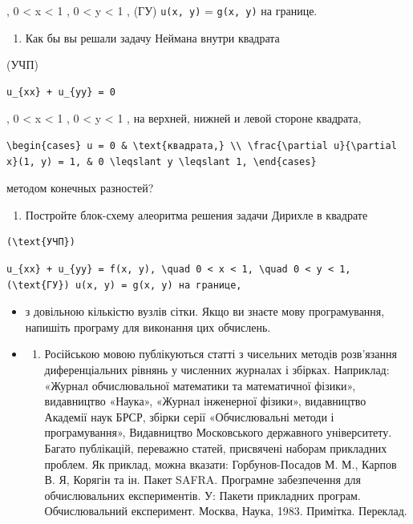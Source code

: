 \documentclass[
  ukrainian,
]{article}
\providecommand{\tightlist}{%
  \setlength{\itemsep}{0pt}\setlength{\parskip}{0pt}}
\begin{document}
, 0 \textless{} x \textless{} 1 , 0 \textless{} y \textless{} 1 , (ГУ)
\texttt{u(x,\ y)} = \texttt{g(x,\ y)} на границе.

\begin{enumerate}
\def\labelenumi{\arabic{enumi}.}
\setcounter{enumi}{4}
\tightlist
\item
  Как бы вы решали задачу Неймана внутри квадрата
\end{enumerate}

(УЧП)

\begin{verbatim}
u_{xx} + u_{yy} = 0
\end{verbatim}

, 0 \textless{} x \textless{} 1 , 0 \textless{} y \textless{} 1 , на
верхней, нижней и левой стороне квадрата,

\begin{verbatim}
\begin{cases} u = 0 & \text{квадрата,} \\ \frac{\partial u}{\partial x}(1, y) = 1, & 0 \leqslant y \leqslant 1, \end{cases}
\end{verbatim}

методом конечных разностей?

\begin{enumerate}
\def\labelenumi{\arabic{enumi}.}
\setcounter{enumi}{5}
\tightlist
\item
  Постройте блок-схему алеоритма решения задачи Дирихле в квадрате
\end{enumerate}

\begin{verbatim}
(\text{УЧП})
\end{verbatim}

\begin{verbatim}
u_{xx} + u_{yy} = f(x, y), \quad 0 < x < 1, \quad 0 < y < 1, (\text{ГУ}) u(x, y) = g(x, y) на границе,
\end{verbatim}

\begin{itemize}
\item
  з довільною кількістю вузлів сітки. Якщо ви знаєте мову програмування,
  напишіть програму для виконання цих обчислень.
\item
  \begin{enumerate}
  \def\labelenumi{\arabic{enumi})}
  \tightlist
  \item
    Російською мовою публікуються статті з чисельних методів розв'язання
    диференціальних рівнянь у численних журналах і збірках. Наприклад:
    «Журнал обчислювальної математики та математичної фізики»,
    видавництво «Наука», «Журнал інженерної фізики», видавництво
    Академії наук БРСР, збірки серії «Обчислювальні методи і
    програмування», Видавництво Московського державного університету.
    Багато публікацій, переважно статей, присвячені наборам прикладних
    проблем. Як приклад, можна вказати: Горбунов-Посадов М. М., Карпов
    В. Я, Корягін та ін. Пакет SAFRA. Програмне забезпечення для
    обчислювальних експериментів. У: Пакети прикладних програм.
    Обчислювальний експеримент. Москва, Наука, 1983. Примітка. Переклад.
  \end{enumerate}
\end{itemize}
\end{document}
